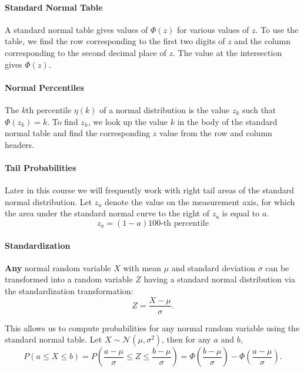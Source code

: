 \paragraph*{Standard Normal Table}
A standard normal table gives values of $\Phi(z)$ for various values of $z$.
To use the table, we find the row corresponding to the first two digits of $z$ and the column corresponding to the second decimal place of $z$.
The value at the intersection gives $\Phi(z)$.

\paragraph*{Normal Percentiles}
The $k$th percentile $\eta(k)$ of a normal distribution is the value $z_k$ such that $\Phi(z_k) = k$.
To find $z_k$, we look up the value $k$ in the body of the standard normal table and find the corresponding $z$ value from the row and column headers.

\paragraph*{Tail Probabilities}
Later in this course we will frequently work with right tail areas of the standard normal distribution. Let 
$z_a$ denote the value on the measurement axis, for which the area under the standard normal curve to the right of $z_a$
is equal to $a$.
\[
    z_a = (1-a)100 \text{-th percentile}
\]

\paragraph*{Standardization}
\textbf{Any} normal random variable $X$ with mean $\mu$ and standard deviation $\sigma$ can be transformed into a random variable $Z$ 
having a standard normal distribution via the standardization transformation:
\[
    Z = \frac{X - \mu}{\sigma}.
\]

This allows us to compute probabilities for any normal random variable using the standard normal table.
Let $X \sim \mathcal{N}(\mu, \sigma^2)$, then for any $a$ and $b$,
\[P(a \leq X \leq b) = P\left(\frac{a - \mu}{\sigma} \leq Z \leq \frac{b - \mu}{\sigma}\right) = \Phi\left(\frac{b - \mu}{\sigma}\right) - \Phi\left(\frac{a - \mu}{\sigma}\right).\]

\pagebreak

